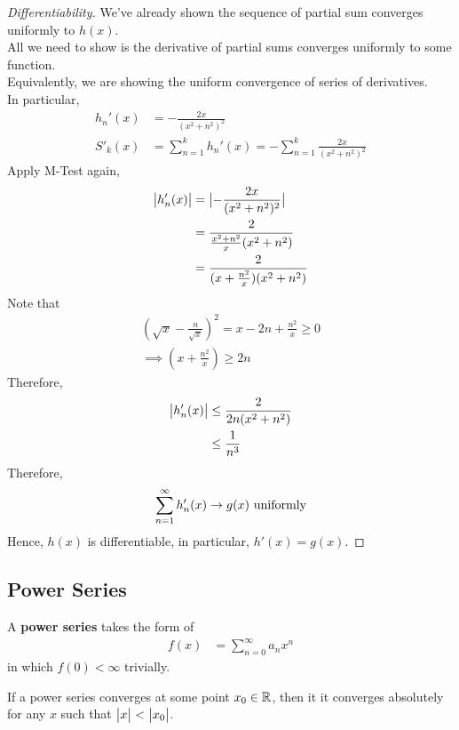 \documentclass[11pt]{article}
\begin{document}
 	\begin{proof}[Differentiability]
 		We've already shown the sequence of partial sum converges uniformly to $h(x)$. \\
 		All we need to show is the derivative of partial sums converges uniformly to some function. \\
 		Equivalently, we are showing the uniform convergence of series of derivatives. \\
 		In particular,
 		\begin{align}
 			h_n'(x) &= -\frac{2x}{(x^2 + n^2)^2} \\
 			S'_k(x) &= \sum_{n=1}^k h_n'(x) = - \sum_{n=1}^k \frac{2x}{(x^2 + n^2)^2}
 		\end{align}
 		Apply M-Test again,
 		\begin{align}
 			\big \vert {h_n'(x)} \big \vert &= \big \vert {-\frac{2x}{(x^2 + n^2)^2}} \big \vert \\
 			&= \frac{2}{\frac{x^2+n^2}{x}(x^2+n^2)} \\
 			&= \frac{2}{(x + \frac{n^2}{x})(x^2 + n^2)}
 		\end{align}
 		Note that 
 		\begin{align}
 			\left(\sqrt{x} - \frac{n}{\sqrt{x}} \right)^2 = x - 2n + \frac{n^2}{x} \geq 0 \\
 			\implies \left(x + \frac{n^2}{x} \right) \geq 2n
 		\end{align}
 		Therefore,
 		\begin{align}
 			\big \vert {h_n'(x)} \big \vert &\leq \frac{2}{2n(x^2 + n^2)} \\
 			&\leq \frac{1}{n^3}
 		\end{align}
 		Therefore,
 		\begin{align}
 			\sum_{n=1}^\infty h'_n(x) \to g(x) \text{{ uniformly}}
 		\end{align}
 		Hence, $h(x)$ is differentiable, in particular, $h'(x) = g(x)$.
 	\end{proof}
 	
 	\subsection{Power Series}
 	\begin{definition}
 		A \textbf{power series} takes the form of 
 		\begin{align}
 			f(x) &= \sum_{n=0}^\infty a_n x^n
 		\end{align}
 		in which $f(0) < \infty$ trivially.
 	\end{definition}
 	
 	\begin{theorem}
 		If a power series converges at some point $x_0 \in \mathbb{R}$, then it it converges absolutely for any $x$ such that $\big \vert {x} \big \vert < \big \vert {x_0} \big \vert$.
 	\end{theorem}
 	
\end{document}
